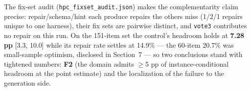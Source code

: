 The fix-set audit (\texttt{hpc\_fixset\_audit.json}) makes the
complementarity claim precise: repair/schema/hint each produce repairs
the others miss (1/2/1 repairs unique to one harness), their fix sets
are pairwise distinct, and \texttt{vote3} contributes no repair on this
run. On the 151-item set the control's headroom holds at \textbf{7.28
pp} {[}3.3, 10.0{]} while its repair rate settles at 14.9\% --- the
60-item 20.7\% was small-sample optimism, disclosed in Section~7 --- so
two conclusions stand with tightened numbers: \textbf{F2} (the domain
admits $\geq$5 pp of instance-conditional headroom at the point estimate) and
the localization of the failure to the generation side.
